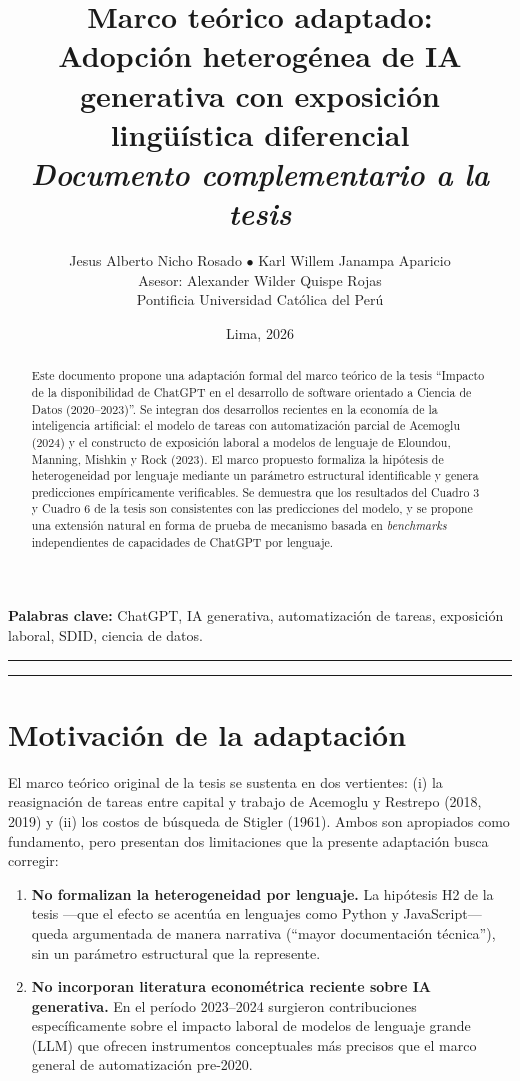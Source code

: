 \documentclass[11pt,a4paper]{article}
\title{\Large Marco teórico adaptado:\\ \textbf{Adopción heterogénea de IA generativa con exposición lingüística diferencial}\\[0.5em] \large \textit{Documento complementario a la tesis}}
\author{Jesus Alberto Nicho Rosado \quad $\bullet$ \quad Karl Willem Janampa Aparicio \\[0.3em] \small Asesor: Alexander Wilder Quispe Rojas \\[0.3em] \small Pontificia Universidad Católica del Perú}
\date{Lima, 2026}
\theoremstyle{definition}
\begin{document}
\maketitle

\begin{abstract}
\noindent Este documento propone una adaptación formal del marco teórico de la tesis ``Impacto de la disponibilidad de ChatGPT en el desarrollo de software orientado a Ciencia de Datos (2020--2023)''. Se integran dos desarrollos recientes en la economía de la inteligencia artificial: el modelo de tareas con automatización parcial de Acemoglu (2024) y el constructo de exposición laboral a modelos de lenguaje de Eloundou, Manning, Mishkin y Rock (2023). El marco propuesto formaliza la hipótesis de heterogeneidad por lenguaje mediante un parámetro estructural identificable y genera predicciones empíricamente verificables. Se demuestra que los resultados del Cuadro 3 y Cuadro 6 de la tesis son consistentes con las predicciones del modelo, y se propone una extensión natural en forma de prueba de mecanismo basada en \textit{benchmarks} independientes de capacidades de ChatGPT por lenguaje.
\end{abstract}

\vspace{0.5em}
\textbf{Palabras clave:} ChatGPT, IA generativa, automatización de tareas, exposición laboral, SDID, ciencia de datos.

\bigskip
\hrule
\bigskip
\tableofcontents
\bigskip
\hrule

\clearpage

\section{Motivación de la adaptación}

El marco teórico original de la tesis se sustenta en dos vertientes: (i) la reasignación de tareas entre capital y trabajo de Acemoglu y Restrepo (2018, 2019) y (ii) los costos de búsqueda de Stigler (1961). Ambos son apropiados como fundamento, pero presentan dos limitaciones que la presente adaptación busca corregir:

\begin{enumerate}[leftmargin=*]
  \item \textbf{No formalizan la heterogeneidad por lenguaje.} La hipótesis H2 de la tesis ---que el efecto se acentúa en lenguajes como Python y JavaScript--- queda argumentada de manera narrativa (``mayor documentación técnica''), sin un parámetro estructural que la represente.
  \item \textbf{No incorporan literatura econométrica reciente sobre IA generativa.} En el período 2023--2024 surgieron contribuciones específicamente sobre el impacto laboral de modelos de lenguaje grande (LLM) que ofrecen instrumentos conceptuales más precisos que el marco general de automatización pre-2020.
\end{enumerate}
\end{document}
